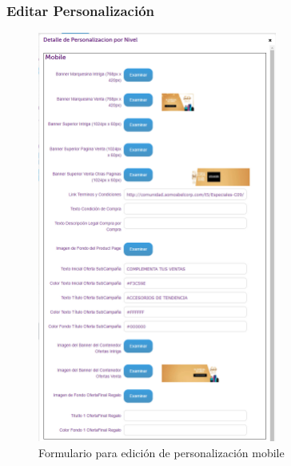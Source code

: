 \documentclass[a4paper,11pt]{paper}
\begin{document}




\newpage
\subsubsection{Editar Personalización}

\begin{figure}[h!]
\centering
\includegraphics[width=0.7\textwidth]{imgs/Personalizacion/FormularioEditarPersonalizacionMobile.png}
\caption{Formulario para edición de personalización mobile}
\end{figure}
\end{document}
